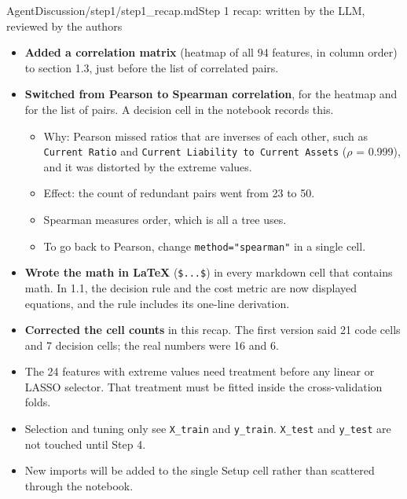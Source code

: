 \begin{mdfile}{AgentDiscussion/\allowbreak{}step1/\allowbreak{}step1\_recap.md}{Step 1 recap: written by the LLM, reviewed by the authors}

\begin{itemize}
\tightlist
\item
  \textbf{Added a correlation matrix} (heatmap of all 94 features, in column order) to section 1.3, just before the list of correlated pairs.
\item
  \textbf{Switched from Pearson to Spearman correlation}, for the heatmap and for the list of pairs. A decision cell in the notebook records this.

  \begin{itemize}
  \tightlist
  \item
    Why: Pearson missed ratios that are inverses of each other, such as \texttt{Current\ Ratio} and \texttt{Current\ Liability\ to\ Current\ Assets} (\ensuremath{\rho} = 0.999), and it was distorted by the extreme values.
  \item
    Effect: the count of redundant pairs went from 23 to 50.
  \item
    Spearman measures order, which is all a tree uses.
  \item
    To go back to Pearson, change \texttt{method="spearman"} in a single cell.
  \end{itemize}
\item
  \textbf{Wrote the math in LaTeX} (\texttt{\$...\$}) in every markdown cell that contains math. In 1.1, the decision rule and the cost metric are now displayed equations, and the rule includes its one-line derivation.
\item
  \textbf{Corrected the cell counts} in this recap. The first version said 21 code cells and 7 decision cells; the real numbers were 16 and 6.
\end{itemize}


\begin{itemize}
\tightlist
\item
  The 24 features with extreme values need treatment before any linear or LASSO selector. That treatment must be fitted inside the cross-validation folds.
\item
  Selection and tuning only see \texttt{X\_train} and \texttt{y\_train}. \texttt{X\_test} and \texttt{y\_test} are not touched until Step 4.
\item
  New imports will be added to the single Setup cell rather than scattered through the notebook.
\end{itemize}
\end{mdfile}

